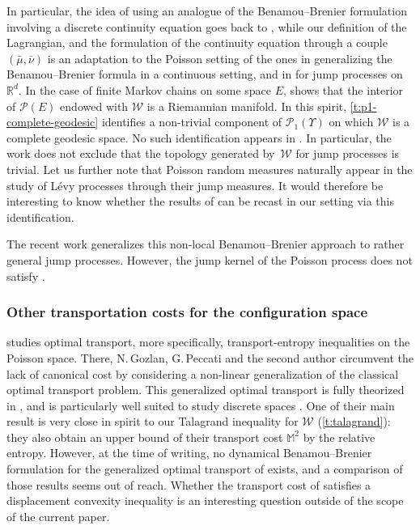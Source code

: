 \documentclass[10pt]{amsart}
\theoremstyle{definition}
\theoremstyle{remark}
\begin{document}
In particular, the idea of using an analogue of the Benamou--Brenier formulation involving a discrete continuity equation goes back to \cite{Maas}, while our definition of the Lagrangian, and the formulation of the continuity equation through a couple $(\bar{\mu}, \bar{\nu})$ is an adaptation to the Poisson setting of the ones in \cite{DNS09} generalizing the Benamou--Brenier formula in a continuous setting, and in \cite{Erbar} for jump processes on $\mathbb{R}^{d}$.
In the case of finite Markov chains on some space $E$, \cite{Maas} shows that the interior of $\mathscr{P}(E)$ endowed with $\mathcal{W}$ is a Riemannian manifold.
In this spirit, \cref{t:p1-complete-geodesic} identifies a non-trivial component of $\mathscr{P}_{1}(\varUpsilon)$ on which $\mathcal{W}$ is a complete geodesic space.
No such identification appears in \cite{Erbar}.
In particular, the work \cite{Erbar} does not exclude that the topology generated by~$\mathcal{W}$ for jump processes is trivial.
Let us further note that Poisson random measures naturally appear in the study of Lévy processes through their jump measures.
It would therefore be interesting to know whether the results of \cite{Erbar} can be recast in our setting via this identification.

The recent work \cite{PRST} generalizes this non-local Benamou--Brenier approach to rather general jump processes.
However, the jump kernel of the Poisson process does not satisfy \cite[Assumpt.\,(3.4)]{PRST}.

\subsubsection{Other transportation costs for the configuration space}
\cite{GHP} studies optimal transport, more specifically, transport-entropy inequalities on the Poisson space.
There, N.\,Gozlan, G.\,Peccati and the second author circumvent the lack of canonical cost by considering a non-linear generalization of the classical optimal transport problem.
This generalized optimal transport is fully theorized in \cite{GRST}, and is particularly well suited to study discrete spaces \cite{GRSTCurvature}.
One of their main result \cite[Th.\,1.2]{GHP} is very close in spirit to our Talagrand inequality for $\mathcal{W}$ (\cref{t:talagrand}): they also obtain an upper bound of their transport cost $\mathbb{M}^{2}$ by the relative entropy.
However, at the time of writing, no dynamical Benamou--Brenier formulation for the generalized optimal transport of \cite{GRST} exists, and a comparison of those results seems out of reach.
Whether the transport cost of \cite{GHP} satisfies a displacement convexity inequality is an interesting question outside of the scope of the current paper.
\end{document}

